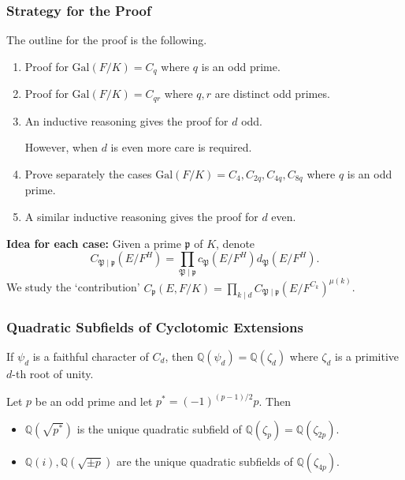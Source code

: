 \documentclass{beamer}
\newcommand{\Gal}{\mathrm{Gal}}
\newcommand{\PP}{\mathfrak{P}}
\newcommand{\QQ}{\mathbb{Q}}
\newcommand{\pp}{\mathfrak{p}}
\theoremstyle{plain}
\begin{document}
\begin{frame}
    \frametitle{Strategy for the Proof}
    The outline for the proof is the following.
    \begin{enumerate}
        \item Proof for $\Gal(F/K)=C_{q}$ where $q$ is an odd prime. \pause
        \item Proof for $\Gal(F/K)=C_{qr}$ where $q,r$ are distinct odd primes. \pause
        \item An inductive reasoning gives the proof for $d$ odd. \pause
        \vspace{0.1cm}

        However, when $d$ is even more care is required.
        \item Prove separately the cases $\Gal(F/K)=C_4, C_{2q}, C_{4q}, C_{8q}$ where $q$ is an odd prime. \pause
        \item A similar inductive reasoning gives the proof for $d$ even. \pause
    \end{enumerate}
    \textbf{Idea for each case:} Given a prime $\pp$ of $K$, denote $$C_{\PP\mid\pp}(E/F^H)=\prod_{\PP\mid\pp}c_\PP(E/F^H)d_\PP(E/F^H).$$
    \pause We study the `contribution' $C_\pp(E,F/K)=\prod_{k\mid d}C_{\PP\mid\pp}(E/F^{C_k})^{\mu(k)}$.
\end{frame}

\begin{frame}
    \frametitle{Quadratic Subfields of Cyclotomic Extensions}
    If $\psi_d$ is a faithful character of $C_d$, then $\QQ(\psi_d)=\QQ(\zeta_d)$ where $\zeta_d$ is a primitive $d$-th root of unity. \pause

    \begin{lemma}
        Let $p$ be an odd prime and let $p^*=(-1)^{(p-1)/2}p$. \pause Then
        \begin{itemize}
            \item $\QQ(\sqrt{p^*})$ is the unique quadratic subfield of $\QQ(\zeta_{p})=\QQ(\zeta_{2p})$. \pause
            \item $\QQ(i), \QQ(\sqrt{\pm p})$ are the unique quadratic subfields of $\QQ(\zeta_{4p})$.
        \end{itemize}
    \end{lemma}
\end{frame}
\end{document}
